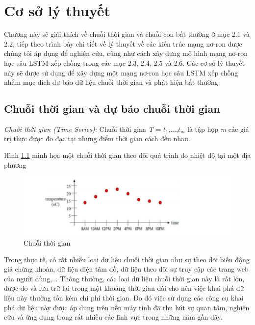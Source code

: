 \chapter{Cơ sở lý thuyết}
Chương này sẽ giải thích về chuỗi thời gian và chuỗi con bất thường ở mục 2.1 và 2.2, tiếp theo trình bày chi tiết về lý thuyết về các kiến trúc mạng nơ-ron được chúng tôi áp dụng để nghiên cứu, cũng như cách xây dựng mô hình mạng nơ-ron học sâu LSTM xếp chồng trong các mục 2.3, 2.4, 2.5 và 2.6. Các cơ sở lý thuyết này sẽ được sử dụng để xây dựng một mạng nơ-ron học sâu LSTM xếp chồng nhằm mục đích dự báo dữ liệu chuỗi thời gian và phát hiện bất thường.

\section{Chuỗi thời gian và dự báo chuỗi thời gian}
\textit{Chuỗi thời gian (Time Series):} Chuỗi thời gian \textit{T} = $t_1$,...,$t_m$ là tập hợp \textit{m} các giá trị thực được đo đạc tại những điểm thời gian cách đều nhau.

Hình \ref{fig:2-1} minh họa một chuỗi thời gian theo dõi quá trình đo nhiệt độ tại một địa phương

\begin{figure}[H]
    \centering
    \includegraphics[scale=0.95]{./content/images/2-1.png}
    \caption{Chuỗi thời gian}
    \label{fig:2-1}
\end{figure}

Trong thực tế, có rất nhiều loại dữ liệu chuỗi thời gian như sự theo dõi biến động giá chứng khoán, dữ liệu điện tâm đồ, dữ liệu theo dõi sự truy cập các trang web của người dùng,... Thông thường, các loại dữ liệu chuỗi thời gian này là rất lớn, được đo và lưu trữ lại trong một khoảng thời gian dài cho nên việc khai phá dữ liệu này thường tốn kém chi phí thời gian. Do đó việc sử dụng các công cụ khai phá dữ liệu này được áp dụng trên nền máy tính đã thu hút sự quan tâm, nghiên cứu và ứng dụng trong rất nhiều các lĩnh vực trong những năm gần đây.


